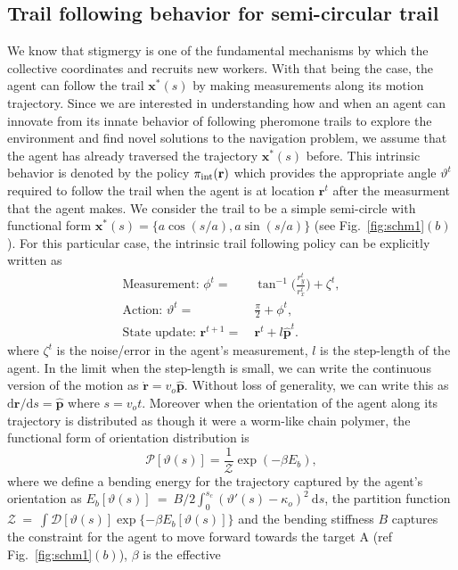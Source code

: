 \documentclass[%
reprint,
superscriptaddress,
floatfix,
amsmath,
amssymb,
aps,
notitlepage
]{revtex4-1}
\def\d{\text{d}}
\def\r{\mathbf{r}}
\def\x{\mathbf{x}}
\def\xst{\mathbf{x}^*}
\def\ph{\hat{\mathbf{p}}}
\def\P{\mathcal{P}}
\def\theta{\vartheta}
\begin{document}
\subsection*{Trail following behavior for semi-circular trail}

We know that stigmergy is one of the fundamental mechanisms by which the collective coordinates
and recruits new workers. With that being the case, the agent can follow the trail $\x^*(s)$ by making
measurements along its motion trajectory. Since we are interested in understanding how and when an
agent can innovate from its innate behavior of following pheromone trails to explore the environment and find novel solutions
to the navigation problem, we assume that the agent has already traversed the trajectory $\x^*(s)$ before.
This intrinsic behavior is denoted by the policy $\pi_{\rm int}(\r)$ which provides the
appropriate angle $\theta^t$ required to follow the trail when the agent is at location
$\r^t$ after the measurment that the agent makes. We consider the trail to be a simple semi-circle
with functional form $\xst(s) = \{ a \cos(s/a), a \sin(s/a) \}$ (see Fig.~\ref{fig:schm1}$(b)$). For this particular case,
the intrinsic trail following policy can be explicitly written as
\begin{align}
    \text{Measurement: } \phi^{t} = & \ \tan^{-1} \bigg( \frac{r_y^t}{r_x^t} \bigg) + \zeta^t, \\
    \text{Action: }\theta^{t} =& \ \frac{\pi}{2} + \phi^{t}, \\
    \text{State update: } \r^{t+1} =& \ \r^t + l \ph^{t}.
\end{align}
where $\zeta^t$ is the noise/error in the agent's measurement, $l$ is the step-length
of the agent. In the limit when the step-length is small, we can write the continuous version
of the motion as $\dot{\r} = v_o \ph$. Without loss of generality, we can write this as
$\d\r/\d s = \ph$ where $s = v_o t$. Moreover when the orientation of the agent
along its trajectory is distributed as though it were a worm-like chain polymer,
the functional form of orientation distribution is
\[
    \P[\theta(s)] = \frac{1}{\mathcal{Z}}\exp{(-\beta E_b)},
\]
where we define a bending energy for the trajectory captured by the agent's orientation as $E_b[\theta(s)]~=~B/2 \int_0^{s_c} (\theta'(s)-\kappa_o)^2~\d s$, the partition
function $\mathcal{Z}~=~\int \mathcal{D}[\theta(s)] \exp\{ {-\beta E_b[\theta(s)]} \}$ and the bending
stiffness $B$ captures the constraint for the agent to move forward towards the target A (ref Fig.~\ref{fig:schm1}$(b)$), $\beta$ is the effective
\end{document}
